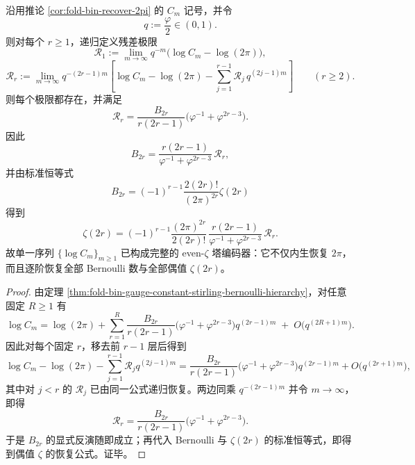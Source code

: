 \begin{theorem}\label{thm:xi-foldbin-gauge-constant-even-zeta-recovery}
沿用推论 \ref{cor:fold-bin-recover-2pi} 的 \(C_m\) 记号，并令
\[
q:=\frac{\varphi}{2}\in(0,1).
\]
则对每个 \(r\ge 1\)，递归定义残差极限
\[
\mathcal R_1:=\lim_{m\to\infty}q^{-m}\bigl(\log C_m-\log(2\pi)\bigr),
\]
\[
\mathcal R_r:=
\lim_{m\to\infty}
q^{-(2r-1)m}
\left[
\log C_m-\log(2\pi)-\sum_{j=1}^{r-1}\mathcal R_j\,q^{(2j-1)m}
\right]
\qquad (r\ge 2).
\]
则每个极限都存在，并满足
\[
\boxed{\;
\mathcal R_r=
\frac{B_{2r}}{r(2r-1)}\bigl(\varphi^{-1}+\varphi^{2r-3}\bigr).
\;}
\]
因此
\[
\boxed{\;
B_{2r}
=
\frac{r(2r-1)}{\varphi^{-1}+\varphi^{2r-3}}\,\mathcal R_r,
\;}
\]
并由标准恒等式
\[
B_{2r}=(-1)^{r-1}\frac{2(2r)!}{(2\pi)^{2r}}\zeta(2r)
\]
得到
\[
\boxed{\;
\zeta(2r)
=
(-1)^{r-1}\frac{(2\pi)^{2r}}{2(2r)!}\,
\frac{r(2r-1)}{\varphi^{-1}+\varphi^{2r-3}}\,
\mathcal R_r.
\;}
\]
故单一序列 \(\{\log C_m\}_{m\ge 1}\) 已构成完整的 even-\(\zeta\) 塔编码器：它不仅内生恢复 \(2\pi\)，而且逐阶恢复全部 Bernoulli 数与全部偶值 \(\zeta(2r)\)。
\end{theorem}
\begin{proof}
由定理 \ref{thm:fold-bin-gauge-constant-stirling-bernoulli-hierarchy}，对任意固定 \(R\ge 1\) 有
\[
\log C_m
=
\log(2\pi)+
\sum_{r=1}^{R}
\frac{B_{2r}}{r(2r-1)}
\bigl(\varphi^{-1}+\varphi^{2r-3}\bigr)
q^{(2r-1)m}
\;+\;
O\!\bigl(q^{(2R+1)m}\bigr).
\]
因此对每个固定 \(r\)，移去前 \(r-1\) 层后得到
\[
\log C_m-\log(2\pi)-\sum_{j=1}^{r-1}\mathcal R_j q^{(2j-1)m}
=
\frac{B_{2r}}{r(2r-1)}\bigl(\varphi^{-1}+\varphi^{2r-3}\bigr)q^{(2r-1)m}
+O\!\bigl(q^{(2r+1)m}\bigr),
\]
其中对 \(j<r\) 的 \(\mathcal R_j\) 已由同一公式递归恢复。两边同乘 \(q^{-(2r-1)m}\) 并令 \(m\to\infty\)，即得
\[
\mathcal R_r=
\frac{B_{2r}}{r(2r-1)}\bigl(\varphi^{-1}+\varphi^{2r-3}\bigr).
\]
于是 \(B_{2r}\) 的显式反演随即成立；再代入 Bernoulli 与 \(\zeta(2r)\) 的标准恒等式，即得到偶值 \(\zeta\) 的恢复公式。证毕。
\end{proof}

